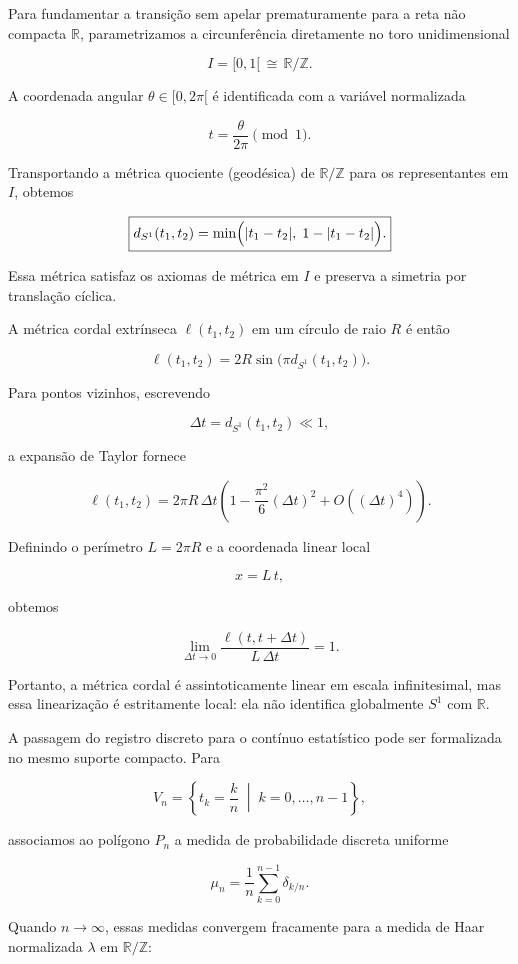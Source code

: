 \documentclass[11pt,a4paper]{article}
\begin{document}
Para fundamentar a transição sem apelar prematuramente para a reta não compacta $\mathbb R$, parametrizamos a circunferência diretamente no toro unidimensional

$$
I=[0,1[\,\cong\,\mathbb R/\mathbb Z.
$$

A coordenada angular $\theta\in[0,2\pi[$ é identificada com a variável normalizada

$$
t=\frac{\theta}{2\pi}\pmod 1.
$$

Transportando a métrica quociente (geodésica) de $\mathbb R/\mathbb Z$ para os representantes em $I$, obtemos

$$
\boxed{
d_{S^1}(t_1,t_2)
=
\min\Bigl(|t_1-t_2|,\;1-|t_1-t_2|\Bigr).
}
$$

Essa métrica satisfaz os axiomas de métrica em $I$ e preserva a simetria por translação cíclica.

A métrica cordal extrínseca $\ell(t_1,t_2)$ em um círculo de raio $R$ é então

$$
\ell(t_1,t_2)
=
2R\sin\bigl(\pi d_{S^1}(t_1,t_2)\bigr).
$$

Para pontos vizinhos, escrevendo

$$
\Delta t=d_{S^1}(t_1,t_2)\ll1,
$$

a expansão de Taylor fornece

$$
\ell(t_1,t_2)
=
2\pi R\,\Delta t
\left(
1-\frac{\pi^2}{6}(\Delta t)^2
+O((\Delta t)^4)
\right).
$$

Definindo o perímetro $L=2\pi R$ e a coordenada linear local

$$
x=L\,t,
$$

obtemos

$$
\boxed{
\lim_{\Delta t\to0}
\frac{\ell(t,t+\Delta t)}
{L\,\Delta t}
=1.
}
$$

Portanto, a métrica cordal é assintoticamente linear em escala infinitesimal, mas essa linearização é estritamente local: ela não identifica globalmente $S^1$ com $\mathbb R$.

A passagem do registro discreto para o contínuo estatístico pode ser formalizada no mesmo suporte compacto. Para

$$
V_n=
\left\{
t_k=\frac{k}{n}
\;\middle|\;
k=0,\ldots,n-1
\right\},
$$

associamos ao polígono $P_n$ a medida de probabilidade discreta uniforme

$$
\mu_n
=
\frac1n
\sum_{k=0}^{n-1}
\delta_{k/n}.
$$

Quando $n\to\infty$, essas medidas convergem fracamente para a medida de Haar normalizada $\lambda$ em $\mathbb R/\mathbb Z$:
\end{document}
